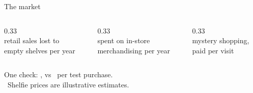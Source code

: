 \begin{frame}{The market}
  \centering
  \begin{columns}[T]
    \begin{column}{0.33\textwidth}\centering
      {\fontsize{28}{32}\selectfont\bfseries\color{cardano}\MarketPain}\\[0.2em]
      {\small retail sales lost to\\ empty shelves per year}
    \end{column}
    \begin{column}{0.33\textwidth}\centering
      {\fontsize{28}{32}\selectfont\bfseries\color{cardano}\MarketServices}\\[0.2em]
      {\small spent on in-store\\ merchandising per year}
    \end{column}
    \begin{column}{0.33\textwidth}\centering
      {\fontsize{28}{32}\selectfont\bfseries\color{cardano}\MarketMystery}\\[0.2em]
      {\small mystery shopping,\\ paid per visit}
    \end{column}
  \end{columns}
  \vspace{1.2em}
  {\large One check: \alert{\PricePerStore}, vs \CostPerVisit\ per test purchase.}\\[0.6em]
  {\scriptsize \MarketSources\ Shelfie prices are illustrative estimates.}
\end{frame}
